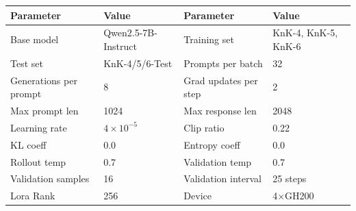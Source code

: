 \documentclass{article}
\theoremstyle{plain}
\theoremstyle{definition}
\theoremstyle{remark}
\begin{document}
\begin{table}[h]
  \centering
  \label{tab:config-knk-easy}
  \begin{tcolorbox}[
    enhanced, hbox,
    title={Training setup for KnK-Easy},
    colback=teal!5, colframe=teal, coltext=black, coltitle=white,
    fonttitle=\bfseries, arc=1mm, boxrule=1pt, boxsep=1pt,
    left=2pt, right=2pt, top=0pt, bottom=2pt,
    toptitle=3pt, bottomtitle=3pt, center
  ]
    \small
    \renewcommand{\arraystretch}{1.2}
    \setlength{\tabcolsep}{8pt}
    \begin{tabular}{l|l|l|l}
      \textbf{Parameter} & \textbf{Value} & \textbf{Parameter} & \textbf{Value} \\
      \hline
      Base model & Qwen2.5-7B-Instruct & Training set & KnK-4, KnK-5, KnK-6 \\
      Test set & KnK-4/5/6-Test & Prompts per batch & 32 \\
      Generations per prompt & 8 & Grad updates per step & 2 \\
      Max prompt len & 1024 & Max response len & 2048 \\
      Learning rate & $4 \times 10^{-5}$ & Clip ratio & 0.22 \\
      KL coeff & 0.0 & Entropy coeff & 0.0 \\
      Rollout temp & 0.7 & Validation temp & 0.7 \\
      Validation samples & 16 & Validation interval & 25 steps \\
      Lora Rank & 256 & Device & 4$\times$GH200 \\
    \end{tabular}
  \end{tcolorbox}
\end{table}
\end{document}
